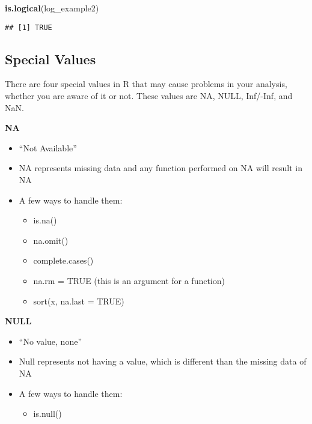 \documentclass[]{article}
\newenvironment{Shaded}{\begin{snugshade}}{\end{snugshade}}
\newcommand{\KeywordTok}[1]{\textcolor[rgb]{0.13,0.29,0.53}{\textbf{#1}}}
\newcommand{\NormalTok}[1]{#1}
\providecommand{\tightlist}{%
  \setlength{\itemsep}{0pt}\setlength{\parskip}{0pt}}
\begin{document}
\begin{Shaded}
\begin{Highlighting}[]
\KeywordTok{is.logical}\NormalTok{(log_example2)}
\end{Highlighting}
\end{Shaded}

\begin{verbatim}
## [1] TRUE
\end{verbatim}

\subsection{Special Values}\label{special-values}

There are four special values in R that may cause problems in your
analysis, whether you are aware of it or not. These values are NA, NULL,
Inf/-Inf, and NaN.

\textbf{NA}

\begin{itemize}
\tightlist
\item
  ``Not Available''
\item
  NA represents missing data and any function performed on NA will
  result in NA
\item
  A few ways to handle them:

  \begin{itemize}
  \tightlist
  \item
    is.na()
  \item
    na.omit()
  \item
    complete.cases()
  \item
    na.rm = TRUE (this is an argument for a function)
  \item
    sort(x, na.last = TRUE)
  \end{itemize}
\end{itemize}

\textbf{NULL}

\begin{itemize}
\tightlist
\item
  ``No value, none''
\item
  Null represents not having a value, which is different than the
  missing data of NA
\item
  A few ways to handle them:

  \begin{itemize}
  \tightlist
  \item
    is.null()
  \end{itemize}
\end{itemize}
\end{document}
